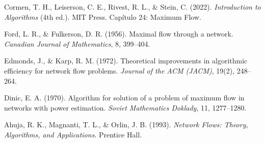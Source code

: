 \documentclass[11pt,a4paper]{article}
\begin{document}
\begin{table}[H]
\centering
\caption{Resumen de auditoría matemática de optimalidad para las tres configuraciones de la red de 10 vértices.}
\label{tab:auditoria_redes}
\end{table}

{}
\begin{thebibliography}{9}
Cormen, T. H., Leiserson, C. E., Rivest, R. L., \& Stein, C. (2022). \textit{Introduction to Algorithms} (4th ed.). MIT Press. Capítulo 24: Maximum Flow.

Ford, L. R., \& Fulkerson, D. R. (1956). Maximal flow through a network. \textit{Canadian Journal of Mathematics}, 8, 399--404.

Edmonds, J., \& Karp, R. M. (1972). Theoretical improvements in algorithmic efficiency for network flow problems. \textit{Journal of the ACM (JACM)}, 19(2), 248--264.

Dinic, E. A. (1970). Algorithm for solution of a problem of maximum flow in networks with power estimation. \textit{Soviet Mathematics Doklady}, 11, 1277--1280.

Ahuja, R. K., Magnanti, T. L., \& Orlin, J. B. (1993). \textit{Network Flows: Theory, Algorithms, and Applications}. Prentice Hall.
\end{thebibliography}
\end{document}

